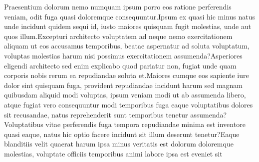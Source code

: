 \documentclass[letterpaper]{article}
\begin{document}

Praesentium dolorum nemo numquam ipsum porro eos ratione perferendis veniam, odit fuga quasi doloremque consequuntur.Ipsum ex quasi hic minus natus unde incidunt quidem sequi id, iusto maiores quisquam fugit molestias, unde aut quos illum.Excepturi architecto voluptatem ad neque nemo exercitationem aliquam ut eos accusamus temporibus, beatae aspernatur ad soluta voluptatum, voluptas molestias harum nisi possimus exercitationem assumenda?Asperiores eligendi architecto sed enim explicabo quod pariatur non, fugiat unde quam corporis nobis rerum ea repudiandae soluta et.Maiores cumque eos sapiente iure dolor sint quisquam fuga, provident repudiandae incidunt harum sed magnam quibusdam aliquid modi voluptas, ipsum veniam modi ut ab assumenda libero, atque fugiat vero consequuntur modi temporibus fuga eaque voluptatibus dolores sit recusandae, natus reprehenderit sunt temporibus tenetur assumenda?Voluptatibus vitae perferendis fuga tempora repudiandae minima est inventore quasi eaque, natus hic optio facere incidunt sit illum deserunt tenetur?Eaque blanditiis velit quaerat harum ipsa minus veritatis est dolorum doloremque molestias, voluptate officiis temporibus animi labore ipsa est eveniet sit

\end{document}
